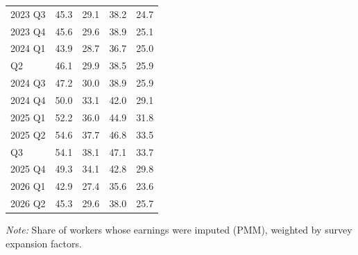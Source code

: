 \begin{table}[H]
{\begin{threeparttable}
\begin{tabular}[t]{lcccc}
        2023 Q3               & 45.3                      & 29.1                     & 38.2    & 24.7    \\
        2023 Q4               & 45.6                      & 29.6                     & 38.9    & 25.1    \\
        2024 Q1               & 43.9                      & 28.7                     & 36.7    & 25.0    \\
        \addlinespace
        2024 Q2               & 46.1                      & 29.9                     & 38.5    & 25.9    \\
        2024 Q3               & 47.2                      & 30.0                     & 38.9    & 25.9    \\
        2024 Q4               & 50.0                      & 33.1                     & 42.0    & 29.1    \\
        2025 Q1               & 52.2                      & 36.0                     & 44.9    & 31.8    \\
        2025 Q2               & 54.6                      & 37.7                     & 46.8    & 33.5    \\
        \addlinespace
        2025 Q3               & 54.1                      & 38.1                     & 47.1    & 33.7    \\
        2025 Q4               & 49.3                      & 34.1                     & 42.8    & 29.8    \\
        2026 Q1               & 42.9                      & 27.4                     & 35.6    & 23.6    \\
        2026 Q2               & 45.3                      & 29.6                     & 38.0    & 25.7    \\
        \bottomrule
      \end{tabular}
      \begin{tablenotes}
        \item \textit{Note: }Share of workers whose earnings were imputed (PMM), weighted by survey expansion factors.
      \end{tablenotes}
    \end{threeparttable}}
\end{table}

